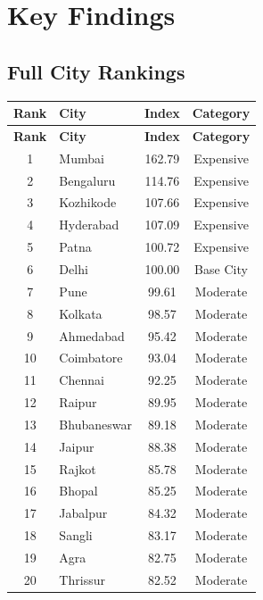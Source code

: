 \documentclass[12pt,a4paper]{article}
\begin{document}
\section{Key Findings}

\subsection{Full City Rankings}

\begin{longtable}{clcc}
  \toprule
  \textbf{Rank} & \textbf{City} & \textbf{Index} & \textbf{Category} \\
  \midrule
  \endfirsthead
  \toprule
  \textbf{Rank} & \textbf{City} & \textbf{Index} & \textbf{Category} \\
  \midrule
  \endhead
  1  & Mumbai             & 162.79 & Expensive \\
  2  & Bengaluru          & 114.76 & Expensive \\
  3  & Kozhikode          & 107.66 & Expensive \\
  4  & Hyderabad          & 107.09 & Expensive \\
  5  & Patna              & 100.72 & Expensive \\
  6  & Delhi              & 100.00 & Base City \\
  7  & Pune               &  99.61 & Moderate \\
  8  & Kolkata            &  98.57 & Moderate \\
  9  & Ahmedabad          &  95.42 & Moderate \\
  10 & Coimbatore         &  93.04 & Moderate \\
  11 & Chennai            &  92.25 & Moderate \\
  12 & Raipur             &  89.95 & Moderate \\
  13 & Bhubaneswar        &  89.18 & Moderate \\
  14 & Jaipur             &  88.38 & Moderate \\
  15 & Rajkot             &  85.78 & Moderate \\
  16 & Bhopal             &  85.25 & Moderate \\
  17 & Jabalpur           &  84.32 & Moderate \\
  18 & Sangli             &  83.17 & Moderate \\
  19 & Agra               &  82.75 & Moderate \\
  20 & Thrissur           &  82.52 & Moderate \\

\end{longtable}
\end{document}
